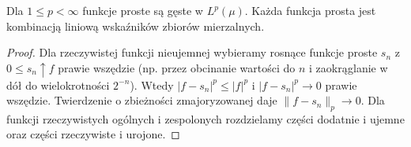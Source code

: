 \begin{lemat}
\label{lem:simple-dense12}
Dla $1\le p<\infty$ funkcje proste są gęste w $L^p(\mu)$.
Każda funkcja prosta jest kombinacją liniową wskaźników
zbiorów mierzalnych.
\end{lemat}
\begin{proof}
Dla rzeczywistej funkcji nieujemnej wybieramy rosnące funkcje
proste $s_n$ z $0\le s_n\uparrow f$ prawie wszędzie
(np. przez obcinanie wartości do $n$ i zaokrąglanie w dół
do wielokrotności $2^{-n}$). Wtedy
$|f-s_n|^p\le|f|^p$ i $|f-s_n|^p\to0$ prawie wszędzie.
Twierdzenie o zbieżności zmajoryzowanej daje
$\|f-s_n\|_p\to0$. Dla funkcji rzeczywistych ogólnych
i zespolonych rozdzielamy części dodatnie i ujemne
oraz części rzeczywiste i urojone.
\end{proof}

